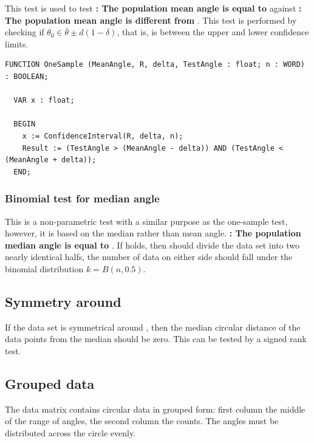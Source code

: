 \begin{refsection}
This test is used to test \textbf{: The population mean angle \skalar{\bar{\theta}} is equal to } against \textbf{: The population mean angle \skalar{\bar{\theta}} is different from }. This test is performed by checking if \( \theta_0 \in \bar{\theta} \pm d(1-\delta) \), that is,  is between the upper and lower confidence limits.

\begin{lstlisting}[caption=One-sample \skalar{t}-test]
  FUNCTION OneSample (MeanAngle, R, delta, TestAngle : float; n : WORD) : BOOLEAN;

  VAR x : float;

  BEGIN
    x := ConfidenceInterval(R, delta, n);
    Result := (TestAngle > (MeanAngle - delta)) AND (TestAngle < (MeanAngle + delta));
  END;
\end{lstlisting}

\subsubsection{Binomial test for median angle}

This is a non-parametric test with a similar purpose as the one-sample test, however, it is based on the median rather than mean angle. \textbf{: The population median angle \skalar{\breve{\theta}} is equal to }. If \textbf{} holds, then  should divide the data set into two nearly identical halfs, the number of data on either side should fall under the binomial distribution \( k = B(n, 0.5) \).

\subsection{Symmetry around \skalar{\breve{\theta}}}

If the data set is symmetrical around \skalar{\breve{\theta}}, then the median circular distance of the data points from the median \skalar{\breve{\theta}} should be zero. This can be tested by a  signed rank test.

\subsection{Grouped data}

The data matrix contains circular data in grouped form: first column the middle of the range of angles, the second column the counts. The angles must be distributed across the circle evenly.


\end{refsection}
